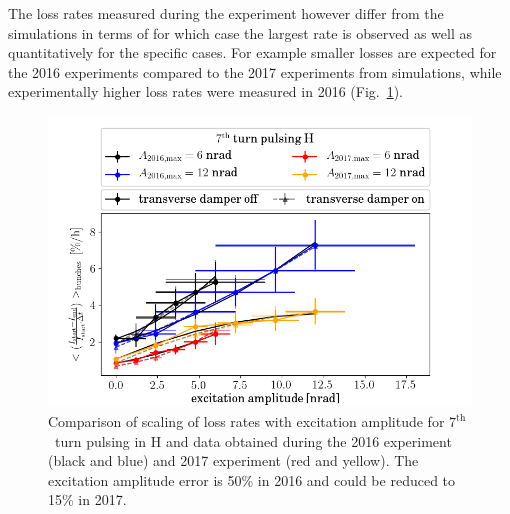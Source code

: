 \documentclass[%
 reprint,
 amsmath,amssymb,
 aps,
prstab,
]{revtex4-1}
\begin{document}
The loss rates measured during the experiment however differ from the simulations in terms of for which case the largest rate is observed as well as quantitatively for the specific cases. For example smaller losses are expected for the 2016 experiments compared to the 2017 experiments from simulations, while experimentally higher loss rates were measured in 2016 (Fig.~\ref{fig:7thexploss}).
\begin{figure}[h]
	\centering
	\includegraphics[width=1.0\linewidth]{2017_scale_amp_7h_lbllong.png}
	\caption{\label{fig:7thexploss} Comparison of scaling of loss rates with excitation amplitude for $7^{\mathrm{th}}$~turn pulsing in H and data obtained during the 2016 experiment (black and blue) and 2017 experiment (red and yellow). The excitation amplitude error is 50\% in 2016 and could be reduced to 15\% in 2017.}
\end{figure}
\end{document}
